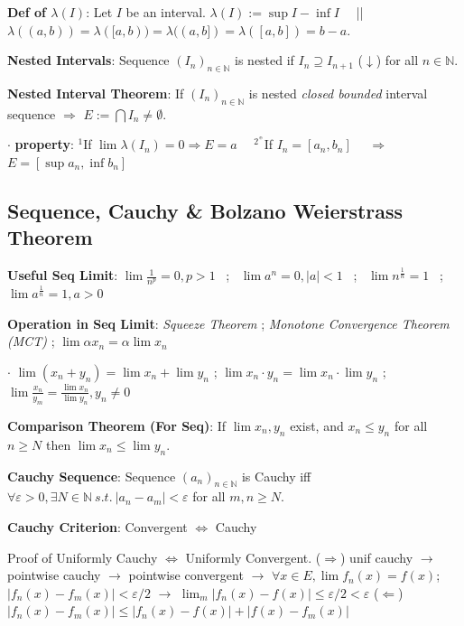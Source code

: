 \documentclass[9pt]{article}
\newcommand{\ex}{{\tiny $^{^{^\oplus}}$}}
\begin{document}
\textbf{Def of $\lambda(I)$}: Let $I$ be an interval. $\lambda(I):=\sup I - \inf I$ \ \ || \ \ $\lambda((a,b))=\lambda([a,b))=\lambda((a,b])=\lambda([a,b])=b-a$.

\textbf{Nested Intervals}: Sequence $(I_n)_{n\in\mathbb{N}}$ is nested if $I_n\supseteq I_{n+1}$ ($\downarrow$) for all $n\in\mathbb{N}$.

\textbf{Nested Interval Theorem}: If $(I_n)_{n\in\mathbb{N}}$ is nested \textit{closed bounded} interval sequence $\Rightarrow$ $E:=\bigcap I_n\ne\emptyset$.

$\cdot$ \textbf{property}: $^1$If $\lim\lambda(I_n)=0\Rightarrow E=a$ \ \ $^2$\ex If $I_n=[a_n,b_n]$ \ \ $\Rightarrow$ \ \ $E=[\sup a_n,\inf b_n]$


\subsection{Sequence, Cauchy \& Bolzano Weierstrass Theorem}

\textbf{Useful Seq Limit}: $\lim \frac{1}{n^p}=0,p>1$ \ ; \ $\lim a^n=0,|a|<1$ \ ; \ $\lim n^\frac{1}{n}=1$ \ ; \ $\lim a^\frac{1}{n}=1,a>0$

\textbf{Operation in Seq Limit}: \textit{Squeeze Theorem} ; \textit{Monotone Convergence Theorem (MCT)} ; $\lim \alpha x_n=\alpha\lim x_n$

$\cdot$ $\lim (x_n + y_n)=\lim x_n + \lim y_n$ ; $\lim x_n \cdot y_n=\lim x_n \cdot \lim y_n$ ; $\lim \frac{x_n}{y_m}=\frac{\lim x_n}{\lim y_n},y_n \ne 0$

\textbf{Comparison Theorem (For Seq)}: If $\lim x_n,y_n$ exist, and $x_n\leq y_n$ for all $n\geq N$ then $\lim x_n\leq\lim y_n.$

\textbf{Cauchy Sequence}: Sequence $(a_n)_{n\in\mathbb{N}}$ is Cauchy iff $\forall\varepsilon>0,\exists N\in\mathbb{N} \ s.t. \ |a_n-a_m|<\varepsilon$ for all $m,n\geq N$.

\textbf{Cauchy Criterion}: Convergent $\Leftrightarrow$ Cauchy 

{\tiny Proof of Uniformly Cauchy $\Leftrightarrow$ Uniformly Convergent. ($\Rightarrow$) unif cauchy $\to$ pointwise cauchy $\to$ pointwise convergent $\to$ $\forall x\in E,\lim f_n(x)=f(x)$; $|f_n(x)-f_m(x)|<\varepsilon/2$ $\to$ $\lim_m|f_n(x)-f(x)|\le\varepsilon/2<\varepsilon$ ($\Leftarrow$) $|f_n(x)-f_m(x)|\le|f_n(x)-f(x)|+|f(x)-f_m(x)|$}
\end{document}
